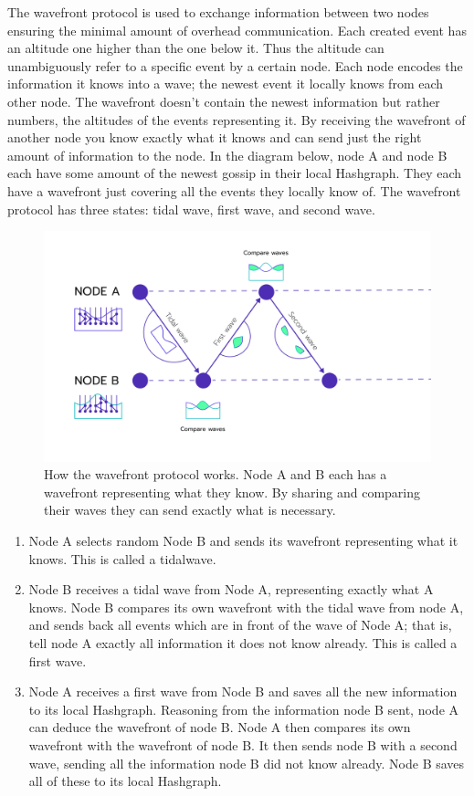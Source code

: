     The \gls{wavefront protocol} is used to exchange information between two nodes ensuring the minimal amount of overhead communication. Each created event has an altitude one higher than the one below it. Thus the altitude can unambiguously refer to a specific event by a certain node. Each node encodes the information it knows into a wave; the newest event it locally knows from each other node. The wavefront doesn't contain the newest information but rather numbers, the altitudes of the events representing it. By receiving the wavefront of another node you know exactly what it knows and can send just the right amount of information to the node. In the diagram below, node A and node B each have some amount of the newest gossip in their local Hashgraph. They each have a wavefront just covering all the events they locally know of. The \gls{wavefront protocol} has three states: tidal wave, first wave, and second wave.

    \begin{figure}[H]
        \centering
        \includegraphics[width=1\textwidth]{figures/wavefront_communication.png}
    	\caption{How the \gls{wavefront protocol} works. Node A and B each has a wavefront representing what they know. By sharing and comparing their waves they can send exactly what is necessary.}
    	\label{fig:wavefront_communication}
    \end{figure}

    \begin{enumerate}
        \item Node A selects random Node B and sends its wavefront representing what it knows. This is called a tidalwave.
        \item Node B receives a tidal wave from Node A, representing exactly what A knows. Node B compares its own wavefront with the tidal wave from node A, and sends back all events which are in front of the wave of Node A; that is, tell node A exactly all information it does not know already. This is called a first wave.
        \item Node A receives a first wave from Node B and saves all the new information to its local Hashgraph. Reasoning from the information node B sent, node A can deduce the wavefront of node B. Node A then compares its own wavefront with the wavefront of node B. It then sends node B with a second wave, sending all the information node B did not know already. Node B saves all of these to its local Hashgraph.
    \end{enumerate}

